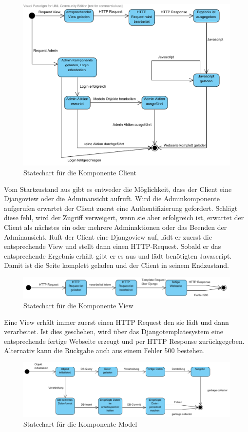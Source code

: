 \begin{figure}
\includegraphics[width=0.8\linewidth]{bilder/KompClient.pdf}
\caption{Statechart für die Komponente Client}
\label{StClient}
\end{figure}

Vom Startzustand aus gibt es entweder die Möglichkeit, dass der Client eine
Djangoview oder die Adminansicht aufruft. Wird die Adminkomponente aufgerufen
erwartet der Client zuerst eine Authentifizierung gefordert. Schlägt diese
fehl, wird der Zugriff verweigert, wenn sie aber erfolgreich ist, erwartet der
Client als nächstes ein oder mehrere Adminaktionen oder das Beenden der
Adminansicht. Ruft der Client eine Djangoview auf, lädt er zuerst die
entsprechende View und stellt dann einen HTTP-Request. Sobald er das
entsprechende Ergebnis erhält gibt er es aus und lädt benötigten Javascript.
Damit ist die Seite komplett geladen und der Client in seinem Endzustand.

\begin{figure}
\includegraphics[width=0.8\linewidth]{bilder/KompView.pdf}
\caption{Statechart für die Komponente View}
\label{StView}
\end{figure}

Eine View erhält immer zuerst einen HTTP Request den sie lädt und dann
verarbeitet. Ist dies geschehen, wird über das Djangotemplatesystem eine
entsprechende fertige Webseite erzeugt und per HTTP Response zurückgegeben.
Alternativ kann die Rückgabe auch aus einem Fehler 500 bestehen.

\begin{figure}
\includegraphics[width=0.8\linewidth]{bilder/KompModel.pdf}
\caption{Statechart für die Komponente Model}
\label{StModel}
\end{figure}

